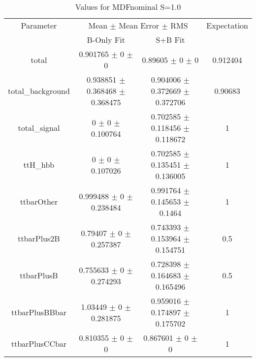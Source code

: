 \begin{table}
\centering
\caption{Values for MDFnominal S=1.0}
\begin{tabular}{cccc}
\toprule
Parameter & \multicolumn{2}{c}{Mean $\pm$ Mean Error $\pm$ RMS} & Expectation\\
 & B-Only Fit & S+B Fit & \\
\midrule
total & \num{0.901765} $\pm$ \num{0} $\pm$ \num{0} & \num{0.89605} $\pm$ \num{0} $\pm$ \num{0} & \num{0.912404}\\
total\_background & \num{0.938851} $\pm$ \num{0.368468} $\pm$ \num{0.368475} & \num{0.904006} $\pm$ \num{0.372669} $\pm$ \num{0.372706} & \num{0.90683}\\
total\_signal & \num{0} $\pm$ \num{0} $\pm$ \num{0.100764} & \num{0.702585} $\pm$ \num{0.118456} $\pm$ \num{0.118672} & \num{1}\\
ttH\_hbb & \num{0} $\pm$ \num{0} $\pm$ \num{0.107026} & \num{0.702585} $\pm$ \num{0.135451} $\pm$ \num{0.136005} & \num{1}\\
ttbarOther & \num{0.999488} $\pm$ \num{0} $\pm$ \num{0.238484} & \num{0.991764} $\pm$ \num{0.145653} $\pm$ \num{0.1464} & \num{1}\\
ttbarPlus2B & \num{0.79407} $\pm$ \num{0} $\pm$ \num{0.257387} & \num{0.743393} $\pm$ \num{0.153964} $\pm$ \num{0.154751} & \num{0.5}\\
ttbarPlusB & \num{0.755633} $\pm$ \num{0} $\pm$ \num{0.274293} & \num{0.728398} $\pm$ \num{0.164683} $\pm$ \num{0.165496} & \num{0.5}\\
ttbarPlusBBbar & \num{1.03449} $\pm$ \num{0} $\pm$ \num{0.281875} & \num{0.959016} $\pm$ \num{0.174897} $\pm$ \num{0.175702} & \num{1}\\
ttbarPlusCCbar & \num{0.810355} $\pm$ \num{0} $\pm$ \num{0} & \num{0.867601} $\pm$ \num{0} $\pm$ \num{0} & \num{1}\\
\bottomrule
\end{tabular}
\end{table}